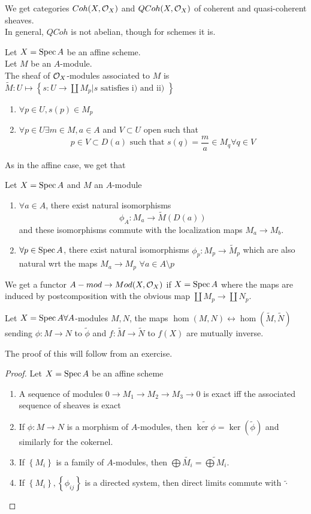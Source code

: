 \documentclass[../main.tex]{subfiles}
\begin{document}
We get categories $Coh( X,\mathcal{O}_X) $ and $QCoh( X,\mathcal{O}_X) $ of coherent and quasi-coherent sheaves.\\
In general, $QCoh$ is not abelian, though for schemes it is.
\begin{defn}
	Let $X= \operatorname{Spec} A$ be an affine scheme.\\
	Let $M$ be an $A$-module.\\
	The sheaf of $\mathcal{O}_X$-modules associated to $M$ is $ \tilde M: U\mapsto \left\{ s: U \to \coprod M_p | s \text{ satisfies i) and ii) }  \right\} $ 
	\begin{enumerate}
	\item $\forall p \in U, s( p) \in M_p$ 
	\item $\forall p \in U\exists m \in M, a \in A$ and $V \subset U$ open such that
		\[ 
		p \in V \subset D( a) \text{ such that  } s( q) = \frac{m}{a}\in M_q \forall q \in V
		\]
		
	\end{enumerate}
\end{defn}
As in the affine case, we get that 
\begin{propo}
Let $X= \operatorname{Spec} A$ and $M$ an $A$-module
\begin{enumerate}
\item $\forall a \in A$, there exist natural isomorphisms
	\[ 
	\phi_A: M_a \to \tilde M ( D( a) ) 
	\]
	and these isomorphisms commute with the localization maps $M_a \to M_b$.
\item $\forall p \in \operatorname{Spec} A$, there exist natural isomorphisms $\phi_p: M_p \to \tilde M _p$ which are also natural wrt the maps $M_a\to M_p$ $\forall a \in A\setminus p$ 
\end{enumerate}
\end{propo}
We get a functor $A-mod \to Mod( X,\mathcal{O}_X)$ if $X= \operatorname{Spec} A$ where the maps are induced by postcomposition with the obvious map $\coprod M_p \to \coprod N_p$.
\begin{lemma}
Let $X= \operatorname{Spec} A\forall A$-modules $M,N$, the maps $\hom( M,N) \leftrightarrow \hom( \tilde M,\tilde N) $ sending $\phi:M\to N $ to $\tilde \phi$ and $f:\tilde M \to \tilde N$ to $f( X) $ are mutually inverse.
\end{lemma}
The proof of this will follow from an exercise.
\begin{proof}
Let $X= \operatorname{Spec} A$ be an affine scheme
\begin{enumerate}
\item A sequence of modules $0\to M_1\to M_2\to M_3\to 0$ is exact iff the associated sequence of sheaves is exact
\item If $\phi:M \to N$ is a morphism of $A$-modules, then $\widetilde{\ker\phi}= \ker ( \tilde\phi) $ and similarly for the cokernel.
\item If $ \left\{ M_i \right\} $ is a family of $A$-modules, then $\bigoplus \tilde{M_i}= \widetilde{\bigoplus M_i}$.
\item If $ \left\{ M_i \right\}, \left\{ \phi_{ij}  \right\}  $ is a directed system, then direct limits commute with $\tilde\cdot$ 
\end{enumerate}
\end{proof}
\end{document}
